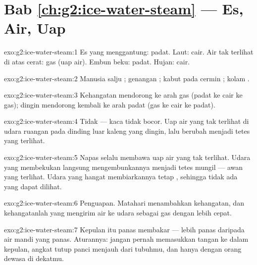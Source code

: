 \section*{Bab \ref{ch:g2:ice-water-steam} --- Es, Air, Uap}

\begin{solution}{exo:g2:ice-water-steam:1}
Es yang menggantung: padat. Laut: cair. Air tak terlihat di atas
cerat: gas (uap air). Embun beku: padat. Hujan: cair.
\end{solution}

\begin{solution}{exo:g2:ice-water-steam:2}
Manusia salju ; genangan ; kabut pada cermin ;
kolam .
\end{solution}

\begin{solution}{exo:g2:ice-water-steam:3}
Kehangatan mendorong ke arah gas (padat ke cair ke gas); dingin
mendorong kembali ke arah padat (gas ke cair ke padat).
\end{solution}

\begin{solution}{exo:g2:ice-water-steam:4}
Tidak --- kaca tidak bocor. Uap air yang tak terlihat di udara ruangan
 pada dinding luar kaleng yang dingin, lalu berubah menjadi
tetes yang terlihat.
\end{solution}

\begin{solution}{exo:g2:ice-water-steam:5}
Napas selalu membawa uap air yang tak terlihat. Udara yang membekukan
langsung mengembunkannya menjadi tetes mungil --- awan yang terlihat.
Udara yang hangat membiarkannya tetap , sehingga tidak ada yang
dapat dilihat.
\end{solution}

\begin{solution}{exo:g2:ice-water-steam:6}
Penguapan. Matahari menambahkan kehangatan, dan kehangatanlah yang
mengirim air ke udara sebagai gas dengan lebih cepat.
\end{solution}

\begin{solution}{exo:g2:ice-water-steam:7}
Kepulan itu panas membakar --- lebih panas daripada air mandi yang
panas. Aturannya: jangan pernah memasukkan tangan ke dalam kepulan,
angkat tutup panci menjauh dari tubuhmu, dan hanya dengan orang dewasa
di dekatmu.
\end{solution}

